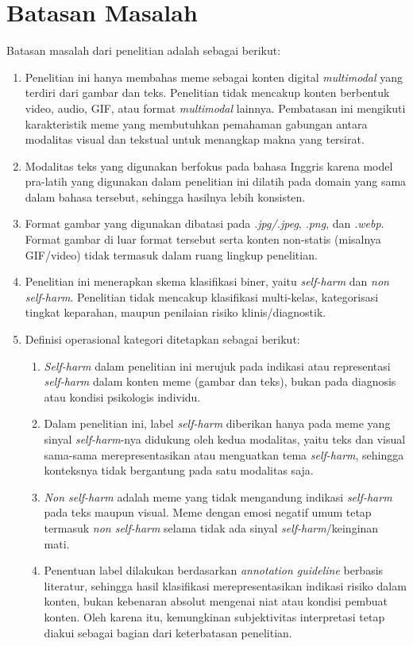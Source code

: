 \section{Batasan Masalah} \label{I.Batasan}
Batasan masalah dari penelitian adalah sebagai berikut: \par

\begin{enumerate}
    \item Penelitian ini hanya membahas meme sebagai konten digital \textit{multimodal} yang terdiri dari gambar dan teks. Penelitian tidak mencakup konten berbentuk video, audio, GIF, atau format \textit{multimodal} lainnya. Pembatasan ini mengikuti karakteristik meme yang membutuhkan pemahaman gabungan antara modalitas visual dan tekstual untuk menangkap makna yang tersirat.

    \item Modalitas teks yang digunakan berfokus pada bahasa Inggris karena model pra-latih yang digunakan dalam penelitian ini dilatih pada domain yang sama dalam bahasa tersebut, sehingga hasilnya lebih konsisten.

    \item Format gambar yang digunakan dibatasi pada \textit{.jpg/.jpeg}, \textit{.png}, dan \textit{.webp}. Format gambar di luar format tersebut serta konten non-statis (misalnya GIF/video) tidak termasuk dalam ruang lingkup penelitian.

    \item Penelitian ini menerapkan skema klasifikasi biner, yaitu \textit{self-harm} dan \textit{non self-harm}. Penelitian tidak mencakup klasifikasi multi-kelas, kategorisasi tingkat keparahan, maupun penilaian risiko klinis/diagnostik.

    \item Definisi operasional kategori ditetapkan sebagai berikut:
    \begin{enumerate}
        \item \textit{Self-harm} dalam penelitian ini merujuk pada indikasi atau representasi \textit{self-harm} dalam konten meme (gambar dan teks), bukan pada diagnosis atau kondisi psikologis individu. 
        \item Dalam penelitian ini, label \textit{self-harm} diberikan hanya pada meme yang sinyal \textit{self-harm}-nya didukung oleh kedua modalitas, yaitu teks dan visual sama-sama merepresentasikan atau menguatkan tema \textit{self-harm}, sehingga konteksnya tidak bergantung pada satu modalitas saja.
        \item \textit{Non self-harm} adalah meme yang tidak mengandung indikasi \textit{self-harm} pada teks maupun visual. Meme dengan emosi negatif umum tetap termasuk \textit{non self-harm} selama tidak ada sinyal \textit{self-harm}/keinginan mati.
        \item Penentuan label dilakukan berdasarkan \textit{annotation guideline} berbasis literatur, sehingga hasil klasifikasi merepresentasikan indikasi risiko dalam konten, bukan kebenaran absolut mengenai niat atau kondisi pembuat konten. Oleh karena itu, kemungkinan subjektivitas interpretasi tetap diakui sebagai bagian dari keterbatasan penelitian.
    \end{enumerate}


\end{enumerate}
